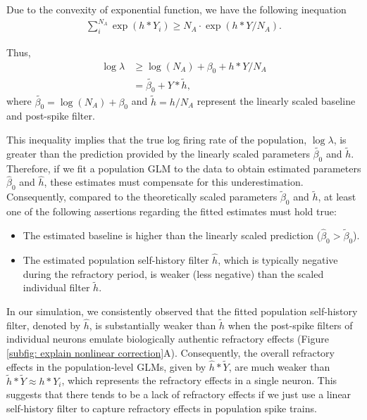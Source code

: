 \documentclass[12pt]{article}
\begin{document}
Due to the convexity of exponential function, we have the following inequation
\begin{align} 
\sum_i^{N_A} \exp(h*Y_i) \geq N_A \cdot \exp(h*Y/N_A).
\end{align}

Thus, 
\begin{align}
\log \lambda &\geq \log(N_A)+\beta_0 + h*Y/N_A \\
&= \tilde{\beta_0} + Y*\tilde{h},
\end{align}
where $\tilde{\beta_0}=\log(N_A)+\beta_0$ and $\tilde{h}=h/N_A$ represent the linearly scaled baseline and post-spike filter.

This inequality implies that the true log firing rate of the population, $\log \lambda$, is greater than the prediction provided by the linearly scaled parameters $\tilde{\beta_0}$ and $\tilde{h}$. Therefore, if we fit a population GLM to the data to obtain estimated parameters $\hat{\beta}_0$ and $\hat{h}$, these estimates must compensate for this underestimation. Consequently, compared to the theoretically scaled parameters $\tilde{\beta}_0$ and $\tilde{h}$, at least one of the following assertions regarding the fitted estimates must hold true:
\begin{itemize}
    \item The estimated baseline is higher than the linearly scaled prediction ($\hat{\beta}_0 > \tilde{\beta}_0$).
    \item The estimated population self-history filter $\hat{h}$, which is typically negative during the refractory period, is weaker (less negative) than the scaled individual filter $\tilde{h}$.
\end{itemize}

In our simulation, we consistently observed that the fitted population self-history filter, denoted by $\hat{h}$, is substantially weaker than $\tilde{h}$ when the post-spike filters of individual neurons emulate biologically authentic refractory effects (Figure \ref{subfig: explain nonlinear correction}A). Consequently, the overall refractory effects in the population-level GLMs, given by $\hat{h}*\tilde{Y}$, are much weaker than $\tilde{h}*\tilde{Y} \approx h*Y_i$, which represents the refractory effects in a single neuron. This suggests that there tends to be a lack of refractory effects if we just use a linear self-history filter to capture refractory effects in population spike trains. 
\end{document}
